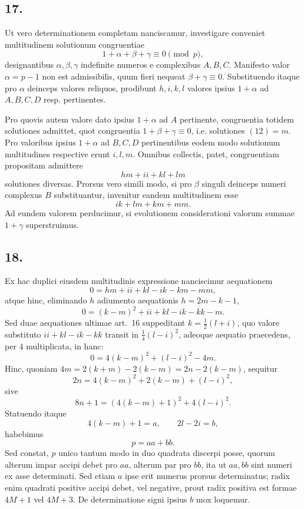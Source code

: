 \documentclass[12pt]{article}
\begin{document}
\subsection*{17.}

Ut vero determinationem completam nanciscamur, investigare conveniet multitudinem solutionum congruentiae
\[
1+\alpha+\beta+\gamma\equiv0\pmod p,
\]
designantibus $\alpha,\beta,\gamma$ indefinite numeros e complexibus $A,B,C$. Manifesto valor $\alpha=p-1$ non est admissibilis, quum fieri nequeat $\beta+\gamma\equiv0$. Substituendo itaque pro $\alpha$ deinceps valores reliquos, prodibunt $h,i,k,l$ valores ipsius $1+\alpha$ ad $A,B,C,D$ resp. pertinentes.

Pro quovis autem valore dato ipsius $1+\alpha$ ad $A$ pertinente, congruentia totidem solutiones admittet, quot congruentia $1+\beta+\gamma\equiv0$, i.e. solutiones $(12)=m$. Pro valoribus ipsius $1+\alpha$ ad $B,C,D$ pertinentibus eodem modo solutionum multitudines respective erunt $i,l,m$. Omnibus collectis, patet, congruentiam propositam admittere
\[
hm+ii+kl+lm
\]
solutiones diversas. Prorsus vero simili modo, si pro $\beta$ singuli deinceps numeri complexus $B$ substituantur, invenitur eandem multitudinem esse
\[
ik+lm+km+mm.
\]
Ad eundem valorem perducimur, si evolutionem considerationi valorum summae $1+\gamma$ superstruimus.

\subsection*{18.}

Ex hac duplici eiusdem multitudinis expressione nanciscimur aequationem
\[
0=hm+ii+kl-ik-km-mm,
\]
atque hinc, eliminando $h$ adiumento aequationis $h=2m-k-1$,
\[
0=(k-m)^2+ii+kl-ik-kk-m.
\]
Sed duae aequationes ultimae art.~16 suppeditant $k=\frac12(l+i)$, quo valore substituto $ii+kl-ik-kk$ transit in $\frac14(l-i)^2$, adeoque aequatio praecedens, per $4$ multiplicata, in hanc:
\[
0=4(k-m)^2+(l-i)^2-4m.
\]
Hinc, quoniam $4m=2(k+m)-2(k-m)=2n-2(k-m)$, sequitur
\[
2n=4(k-m)^2+2(k-m)+(l-i)^2,
\]
sive
\[
8n+1=(4(k-m)+1)^2+4(l-i)^2.
\]
Statuendo itaque
\[
4(k-m)+1=a,\qquad 2l-2i=b,
\]
habebimus
\[
p=aa+bb.
\]
Sed constat, $p$ unico tantum modo in duo quadrata discerpi posse, quorum alterum impar accipi debet pro $aa$, alterum par pro $bb$, ita ut $aa,bb$ sint numeri ex asse determinati. Sed etiam $a$ ipse erit numerus prorsus determinatus; radix enim quadrati positive accipi debet, vel negative, prout radix positiva est formae $4M+1$ vel $4M+3$. De determinatione signi ipsius $b$ mox loquemur.
\end{document}
